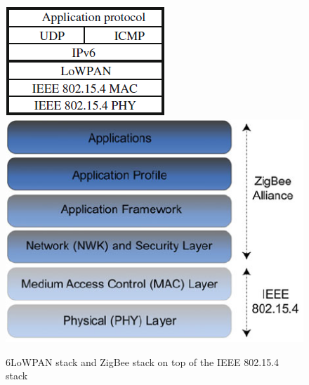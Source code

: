 \begin{figure}[H]
\centering
\includegraphics[scale=0.81]{figure/6LoWPANstack.png}
\includegraphics[scale=0.4]{figure/ZigBeestack.png}
\caption{6LoWPAN stack and ZigBee stack on top of the IEEE 802.15.4 stack}
\label{fig:protocolstacks}
\end{figure}